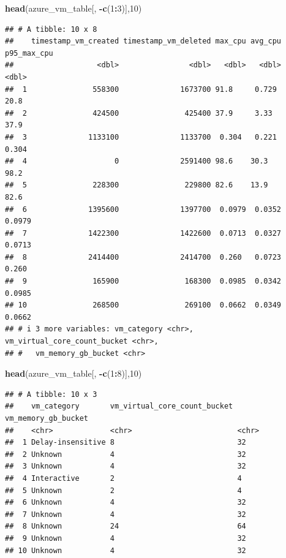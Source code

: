\documentclass[
]{article}
\newenvironment{Shaded}{\begin{snugshade}}{\end{snugshade}}
\newcommand{\DecValTok}[1]{\textcolor[rgb]{0.00,0.00,0.81}{#1}}
\newcommand{\FunctionTok}[1]{\textcolor[rgb]{0.13,0.29,0.53}{\textbf{#1}}}
\newcommand{\NormalTok}[1]{#1}
\newcommand{\SpecialCharTok}[1]{\textcolor[rgb]{0.81,0.36,0.00}{\textbf{#1}}}
\begin{document}
\begin{Shaded}
\begin{Highlighting}[]
\FunctionTok{head}\NormalTok{(azure\_vm\_table[, }\SpecialCharTok{{-}}\FunctionTok{c}\NormalTok{(}\DecValTok{1}\SpecialCharTok{:}\DecValTok{3}\NormalTok{)],}\DecValTok{10}\NormalTok{)}
\end{Highlighting}
\end{Shaded}

\begin{verbatim}
## # A tibble: 10 x 8
##    timestamp_vm_created timestamp_vm_deleted max_cpu avg_cpu p95_max_cpu
##                   <dbl>                <dbl>   <dbl>   <dbl>       <dbl>
##  1               558300              1673700 91.8     0.729      20.8   
##  2               424500               425400 37.9     3.33       37.9   
##  3              1133100              1133700  0.304   0.221       0.304 
##  4                    0              2591400 98.6    30.3        98.2   
##  5               228300               229800 82.6    13.9        82.6   
##  6              1395600              1397700  0.0979  0.0352      0.0979
##  7              1422300              1422600  0.0713  0.0327      0.0713
##  8              2414400              2414700  0.260   0.0723      0.260 
##  9               165900               168300  0.0985  0.0342      0.0985
## 10               268500               269100  0.0662  0.0349      0.0662
## # i 3 more variables: vm_category <chr>, vm_virtual_core_count_bucket <chr>,
## #   vm_memory_gb_bucket <chr>
\end{verbatim}

\begin{Shaded}
\begin{Highlighting}[]
\FunctionTok{head}\NormalTok{(azure\_vm\_table[, }\SpecialCharTok{{-}}\FunctionTok{c}\NormalTok{(}\DecValTok{1}\SpecialCharTok{:}\DecValTok{8}\NormalTok{)],}\DecValTok{10}\NormalTok{)}
\end{Highlighting}
\end{Shaded}

\begin{verbatim}
## # A tibble: 10 x 3
##    vm_category       vm_virtual_core_count_bucket vm_memory_gb_bucket
##    <chr>             <chr>                        <chr>              
##  1 Delay-insensitive 8                            32                 
##  2 Unknown           4                            32                 
##  3 Unknown           4                            32                 
##  4 Interactive       2                            4                  
##  5 Unknown           2                            4                  
##  6 Unknown           4                            32                 
##  7 Unknown           4                            32                 
##  8 Unknown           24                           64                 
##  9 Unknown           4                            32                 
## 10 Unknown           4                            32
\end{verbatim}
\end{document}
